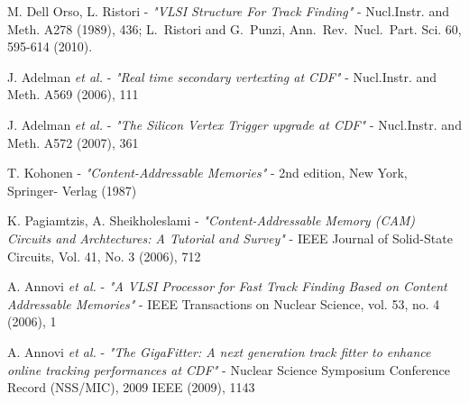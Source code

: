 \documentclass{cmspaper}
\begin{document}
%






%



\newpage
\thispagestyle{empty}

\begin{thebibliography}{99}


 M. Dell Orso, L. Ristori - {\it "VLSI Structure For Track Finding"} - Nucl.Instr. and Meth. A278 (1989), 436; L.~Ristori and G.~Punzi, Ann.~Rev.~Nucl.~Part. Sci. 60, 595-614 (2010).


 J. Adelman {\it et al.} - {\it "Real time secondary vertexting at CDF"} - Nucl.Instr. and Meth. A569 (2006), 111

 J. Adelman {\it et al.} - {\it "The Silicon Vertex Trigger upgrade at CDF"} - Nucl.Instr. and Meth. A572 (2007), 361

 T. Kohonen - {\it "Content-Addressable Memories"} - 2nd edition, New York, Springer- Verlag (1987)

 K. Pagiamtzis, A. Sheikholeslami - {\it "Content-Addressable Memory (CAM) Circuits and Archtectures: A Tutorial and Survey"} - IEEE Journal of Solid-State Circuits, Vol. 41, No. 3 (2006), 712





 A. Annovi {\it et al.} - {\it "A VLSI Processor for Fast Track Finding Based on Content Addressable Memories"} - IEEE Transactions on Nuclear Science, vol. 53, no. 4 (2006), 1

 A. Annovi {\it et al.} - {\it "The GigaFitter: A next generation track fitter to enhance online tracking performances at CDF"} - Nuclear Science Symposium Conference Record (NSS/MIC), 2009 IEEE (2009), 1143


\end{thebibliography}
\end{document}
